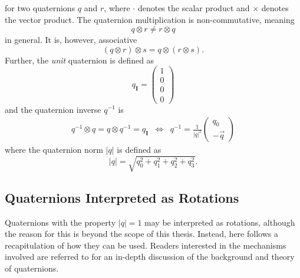 \documentclass{LTHthesis}
\begin{document}
%
for two quaternions $q$ and $r$, where $\cdot$ denotes the scalar product and $\times$ denotes the vector product. The quaternion multiplication is non-commutative, meaning
%
\begin{equation}
{q}\otimes {r} \neq {r} \otimes {q}
\end{equation}
%
in general. It is, however, associative
%
\begin{equation}
({q}\otimes{r})\otimes{s} = {q}\otimes({r}\otimes{s}).
\label{equation:quat_asso}
\end{equation} 
%
Further, the \emph{unit} quaternion is defined as
%
\begin{equation}
{q_{\mathbf{I}}}=\left(\begin{array}{c}1\\ 0 \\ 0 \\ 0\end{array}\right)
\end{equation}
%
and the quaternion inverse $q^{-1}$ is
%
\begin{eqnarray}
q^{-1}\otimes q = q\otimes q^{-1} = q_{\mathbf{I}} &\Leftrightarrow& q^{-1} = \frac{1}{|q|^2}\left(\begin{array}{c}q_0\\ -\vec{q}\end{array}\right)
\end{eqnarray}
%
where the quaternion norm $|q|$ is defined as
%
\begin{equation}
|q| = \sqrt{q_0^2+q_1^2+q_2^2+q_3^2 }.
\end{equation} 
%
\subsection{Quaternions Interpreted as Rotations}
%
Quaternions with the property $|q|=1$ may be interpreted as rotations, although the reason for this is beyond the scope of this thesis. Instead, here follows a recapitulation of how they can be used. Readers interested in the mechanisms involved are referred to \cite{kuip98} for an in-depth discussion of the background and theory of quaternions. 
\end{document}
